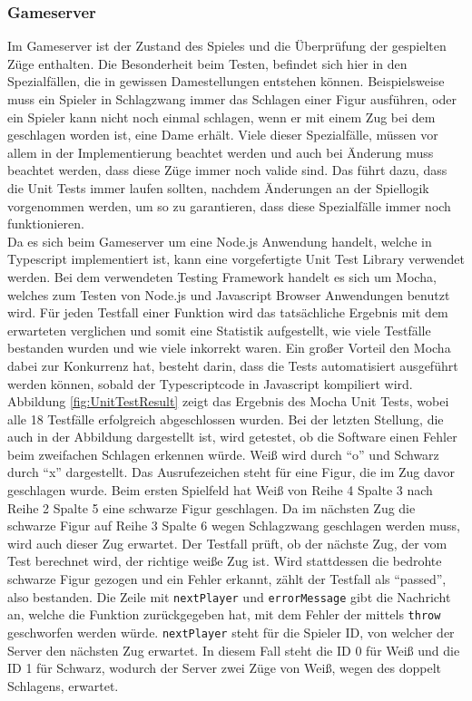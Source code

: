 \documentclass[12pt,a4paper,bibliography=totocnumbered,listof=totocnumbered]{article}
\begin{document}
\subsubsection{Gameserver}
Im Gameserver ist der Zustand des Spieles und die Überprüfung der gespielten Züge enthalten. 
Die Besonderheit beim Testen, befindet sich hier in den Spezialfällen, die in gewissen Damestellungen entstehen können. Beispielsweise muss ein
Spieler in Schlagzwang immer das Schlagen einer Figur ausführen, oder ein Spieler kann nicht noch einmal schlagen, wenn er mit einem Zug bei dem geschlagen worden ist,
eine Dame erhält. Viele dieser Spezialfälle, müssen vor allem in der Implementierung beachtet werden und auch bei Änderung muss beachtet werden, dass 
diese Züge immer noch valide sind. Das führt dazu, dass die Unit Tests immer laufen sollten, nachdem Änderungen an der Spiellogik vorgenommen werden,
um so zu garantieren, dass diese Spezialfälle immer noch funktionieren.
\\
Da es sich beim Gameserver um eine Node.js Anwendung handelt, welche in Typescript implementiert ist, kann eine vorgefertigte Unit Test Library verwendet werden.
Bei dem verwendeten Testing Framework handelt es sich um Mocha, welches zum Testen von Node.js und Javascript Browser Anwendungen benutzt wird. 
Für jeden Testfall einer Funktion wird das tatsächliche Ergebnis mit dem erwarteten verglichen und somit eine Statistik aufgestellt, wie viele Testfälle 
bestanden wurden und wie viele inkorrekt waren. Ein großer Vorteil den Mocha dabei zur Konkurrenz hat, besteht darin, dass die Tests automatisiert ausgeführt werden 
können, sobald der Typescriptcode in Javascript kompiliert wird.
\\ 
Abbildung \ref{fig:UnitTestResult} zeigt das Ergebnis des Mocha Unit Tests, wobei alle 18 Testfälle erfolgreich abgeschlossen wurden.
Bei der letzten Stellung, die auch in der Abbildung dargestellt ist, wird getestet, ob die Software einen Fehler beim zweifachen Schlagen erkennen würde.
Weiß wird durch ``o'' und Schwarz durch ``x'' dargestellt. Das Ausrufezeichen steht für eine Figur, die im Zug davor geschlagen wurde. 
Beim ersten Spielfeld hat Weiß von Reihe 4 Spalte 3 nach Reihe 2 Spalte 5 eine schwarze Figur geschlagen. Da im nächsten Zug die schwarze Figur auf 
Reihe 3 Spalte 6 wegen Schlagzwang geschlagen werden muss, wird auch dieser Zug erwartet. Der Testfall prüft, ob der nächste Zug, der 
vom Test berechnet wird, der richtige weiße Zug ist. Wird stattdessen die bedrohte schwarze Figur gezogen und ein Fehler erkannt, zählt der Testfall als ``passed'', also bestanden.
Die Zeile mit \texttt{nextPlayer} und \texttt{errorMessage} gibt die Nachricht an, welche die Funktion zurückgegeben hat, mit dem Fehler der
mittels \texttt{throw} geschworfen werden würde. \texttt{nextPlayer} steht für die Spieler ID, von welcher der Server den nächsten Zug erwartet.
In diesem Fall steht die ID 0 für Weiß und die ID 1 für Schwarz, wodurch der Server zwei Züge von Weiß, wegen des doppelt Schlagens, erwartet.
\end{document}
